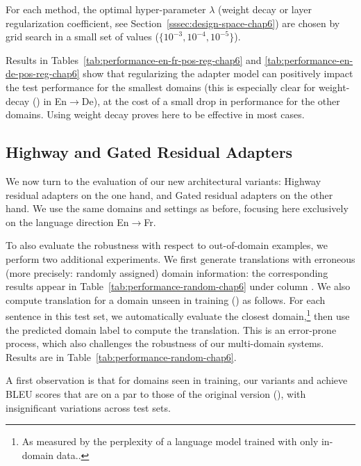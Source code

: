 For each method, the optimal hyper-parameter $\lambda$ (weight decay or layer regularization coefficient, see Section~\ref{sssec:design-space-chap6}) are chosen by grid search in a small set of values ($\{ 10^{-3}, 10^{-4}, 10^{-5} \}$).

Results in Tables~\ref{tab:performance-en-fr-pos-reg-chap6} and \ref{tab:performance-en-de-pos-reg-chap6} show that regularizing the adapter model can positively impact the test performance for the smallest domains (this is especially clear for weight-decay () in En$\rightarrow$De), at the cost of a small drop in performance for the other domains. Using weight decay proves here to be effective in most cases.

\subsection{Highway and Gated Residual Adapters \label{ssec:gate-exp-chap6}}

We now turn to the evaluation of our new architectural variants: Highway residual adapters  on the one hand, and Gated residual adapters  on the other hand. We use the same domains and settings as before, focusing here exclusively on the language direction En$\rightarrow$Fr.

To also evaluate the robustness with respect to out-of-domain examples, we perform two additional experiments. We first generate translations with erroneous (more precisely: randomly assigned) domain information: the corresponding results appear in Table~\ref{tab:performance-random-chap6} under column . We also compute translation for a domain unseen in training () as follows. For each sentence in this test set, we automatically evaluate the closest domain,\footnote{As measured by the perplexity of a language model trained with only in-domain data..} then use the predicted domain label to compute the translation. This is an error-prone process, which also challenges the robustness of our multi-domain systems. Results are in Table~\ref{tab:performance-random-chap6}.

A first observation is that for domains seen in training, our variants  and  achieve BLEU scores that are on a par to those of the original version (), with insignificant variations across test sets.

